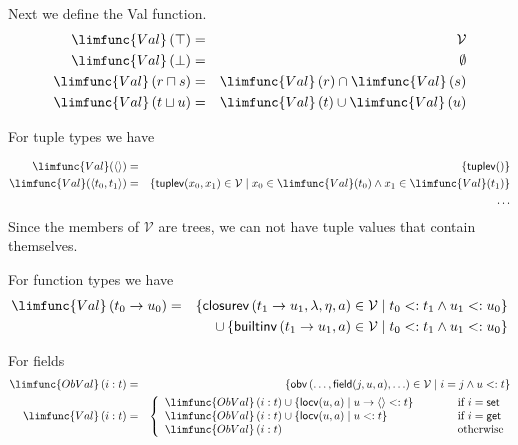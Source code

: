 \documentclass[12pt]{article}
\begin{document}
Next we define the Val function.%
\begin{eqnarray*}
\limfunc{Val}\left( \top \right)  &=&\mathcal{V} \\
\limfunc{Val}\left( \bot \right)  &=&\emptyset  \\
\limfunc{Val}\left( r\sqcap s\right)  &=&\limfunc{Val}\left( r\right) \cap 
\limfunc{Val}\left( s\right)  \\
\limfunc{Val}\left( t\sqcup u\right)  &=&\limfunc{Val}\left( t\right) \cup 
\limfunc{Val}\left( u\right) 
\end{eqnarray*}

For tuple types we have

\begin{eqnarray*}
\limfunc{Val}(\left\langle {}\right\rangle ) &=&\left\{ \mathsf{tuplev()}%
\right\}  \\
\limfunc{Val}(\left\langle t_{0},t_{1}\right\rangle ) &=&\left\{ \mathsf{%
tuplev}(x_{0},x_{1})\in \mathcal{V}\mid x_{0}\in \limfunc{Val}(t_{0})\wedge
x_{1}\in \limfunc{Val}(t_{1})\right\}  \\
&&\ldots 
\end{eqnarray*}%
Since the members of $\mathcal{V}$ are trees, we can not have tuple values
that contain themselves.

For function types we have%
\begin{eqnarray*}
\limfunc{Val}\left( t_{0}\rightarrow u_{0}\right)  &=&\left\{ \mathsf{%
closurev}\left( t_{1}\rightarrow u_{1},\lambda ,\eta ,a\right) \in \mathcal{V%
}\mid t_{0}<:t_{1}\wedge u_{1}<:u_{0}\right\}  \\
&&\cup \left\{ \mathsf{builtinv}\left( t_{1}\rightarrow u_{1},a\right) \in 
\mathcal{V}\mid t_{0}<:t_{1}\wedge u_{1}<:u_{0}\right\} 
\end{eqnarray*}

For fields%
\begin{eqnarray*}
\limfunc{ObVal}\left( i:t\right)  &=&\left\{ \mathsf{obv}\left( \ldots ,%
\mathsf{field}(j,u,a),\ldots \right) \in \mathcal{V}\mid i=j\wedge
u<:t\right\}  \\
\limfunc{Val}\left( i:t\right)  &=&\left\{ 
\begin{array}{lll}
\limfunc{ObVal}\left( i:t\right) \cup \left\{ \mathsf{locv}(u,a)\mid
u\rightarrow \left\langle {}\right\rangle <:t\right\}  & \qquad  & \text{if }%
i=\mathsf{set} \\ 
\limfunc{ObVal}\left( i:t\right) \cup \left\{ \mathsf{locv}(u,a)\mid
u<:t\right\}  &  & \text{if }i=\mathsf{get} \\ 
\limfunc{ObVal}\left( i:t\right)  &  & \text{otherwise}%
\end{array}%
\right. 
\end{eqnarray*}
\end{document}
